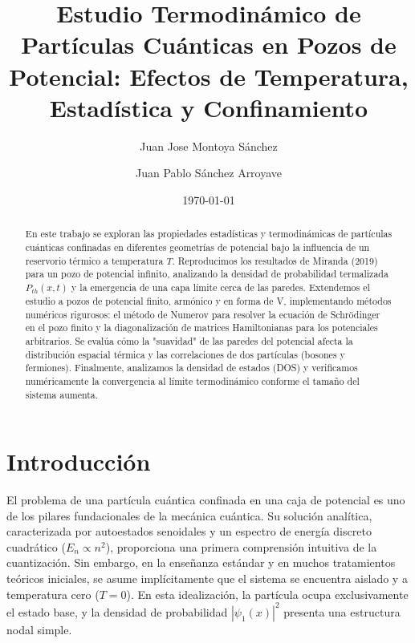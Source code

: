 \documentclass[twocolumn,superscriptaddress,prl,10pt]{revtex4-2}
\begin{document}
\setcounter{secnumdepth}{3}

\title{Estudio Termodinámico de Partículas Cuánticas en Pozos de Potencial: Efectos de Temperatura, Estadística y Confinamiento}

\author{Juan Jose Montoya Sánchez}
\author{Juan Pablo Sánchez Arroyave}

\date{\today}

\begin{abstract}
En este trabajo se exploran las propiedades estadísticas y termodinámicas de partículas cuánticas confinadas en diferentes geometrías de potencial bajo la influencia de un reservorio térmico a temperatura $T$. Reproducimos los resultados de Miranda (2019) para un pozo de potencial infinito, analizando la densidad de probabilidad termalizada $P_{th}(x,t)$ y la emergencia de una capa límite cerca de las paredes. Extendemos el estudio a pozos de potencial finito, armónico y en forma de V, implementando métodos numéricos rigurosos: el método de Numerov para resolver la ecuación de Schrödinger en el pozo finito y la diagonalización de matrices Hamiltonianas para los potenciales arbitrarios. Se evalúa cómo la "suavidad" de las paredes del potencial afecta la distribución espacial térmica y las correlaciones de dos partículas (bosones y fermiones). Finalmente, analizamos la densidad de estados (DOS) y verificamos numéricamente la convergencia al límite termodinámico conforme el tamaño del sistema aumenta.
\end{abstract}

\maketitle

\section{Introducción}

El problema de una partícula cuántica confinada en una caja de potencial es uno de los pilares fundacionales de la mecánica cuántica. Su solución analítica, caracterizada por autoestados senoidales y un espectro de energía discreto cuadrático ($E_n \propto n^2$), proporciona una primera comprensión intuitiva de la cuantización. Sin embargo, en la enseñanza estándar y en muchos tratamientos teóricos iniciales, se asume implícitamente que el sistema se encuentra aislado y a temperatura cero ($T=0$). En esta idealización, la partícula ocupa exclusivamente el estado base, y la densidad de probabilidad $|\psi_1(x)|^2$ presenta una estructura nodal simple.
\end{document}
